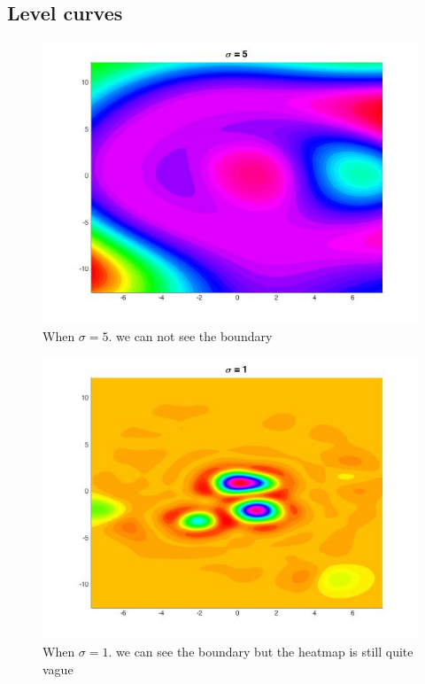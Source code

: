 \documentclass[twoside]{article}
\theoremstyle{definition}
\theoremstyle{definition}
\theoremstyle{remark}
\begin{document}
\subsection{Level curves}
\begin{figure}[H]
\centering
\includegraphics[width=120mm]{sigma_5.jpg}
\caption{ When $\sigma = 5$. we can not see the boundary \label{problem2Pic2}}
\end{figure}

\begin{figure}[H]
\centering
\includegraphics[width=120mm]{sigma_1.jpg}
\caption{ When $\sigma = 1$. we can see the boundary but the heatmap is still quite vague\label{problem2Pic3}}
\end{figure}
\end{document}
